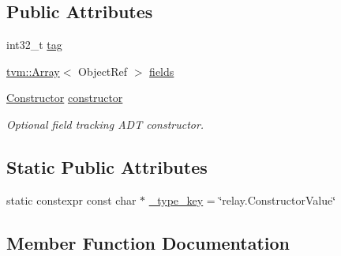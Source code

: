 \subsection*{Public Attributes}
\begin{DoxyCompactItemize}
\item 
int32\+\_\+t \hyperlink{structtvm_1_1relay_1_1ConstructorValueObj_a4367c76ceee867b91ddd790931a1a362}{tag}
\item 
\hyperlink{classtvm_1_1Array}{tvm\+::\+Array}$<$ Object\+Ref $>$ \hyperlink{structtvm_1_1relay_1_1ConstructorValueObj_a4ef262fa950a75da96814a5e539732a9}{fields}
\item 
\hyperlink{namespacetvm_1_1relay_aec85bf097deda59bd22e88475c9165e9}{Constructor} \hyperlink{structtvm_1_1relay_1_1ConstructorValueObj_a8a8374bec3445e7225ec5ee3fcdb5b6e}{constructor}
\begin{DoxyCompactList}\small\item\em Optional field tracking A\+DT constructor. \end{DoxyCompactList}\end{DoxyCompactItemize}
\subsection*{Static Public Attributes}
\begin{DoxyCompactItemize}
\item 
static constexpr const char $\ast$ \hyperlink{structtvm_1_1relay_1_1ConstructorValueObj_a4854d6b1fc7047a03af41548b995df24}{\+\_\+type\+\_\+key} = \char`\"{}relay.\+Constructor\+Value\char`\"{}
\end{DoxyCompactItemize}


\subsection{Member Function Documentation}
